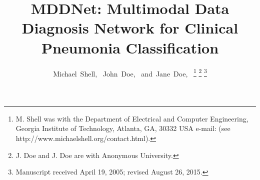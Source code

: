 \documentclass[journal]{IEEEtran}
\begin{document}
%
\title{MDDNet: Multimodal Data Diagnosis Network for Clinical Pneumonia Classification}
%
%
%

\author{Michael~Shell,~
        John~Doe,~
        and~Jane~Doe,~%
\thanks{M. Shell was with the Department
of Electrical and Computer Engineering, Georgia Institute of Technology, Atlanta,
GA, 30332 USA e-mail: (see http://www.michaelshell.org/contact.html).}%
\thanks{J. Doe and J. Doe are with Anonymous University.}%
\thanks{Manuscript received April 19, 2005; revised August 26, 2015.}}

% 
%
\end{document}
